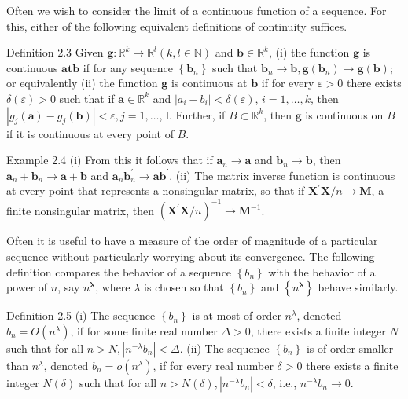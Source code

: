 \documentclass[10pt]{article}
\begin{document}
Often we wish to consider the limit of a continuous function of a sequence. For this, either of the following equivalent definitions of continuity suffices.

Definition 2.3 Given $\mathbf{g}: \mathbb{R}^{k} \rightarrow \mathbb{R}^{l}(k, l \in \mathbb{N})$ and $\mathbf{b} \in \mathbb{R}^{k}$, (i) the function $\mathbf{g}$ is continuous $\mathbf{a t} \mathbf{b}$ if for any sequence $\left\{\mathbf{b}_{n}\right\}$ such that $\mathbf{b}_{n} \rightarrow \mathbf{b}, \mathbf{g}\left(\mathbf{b}_{n}\right) \rightarrow \mathbf{g}(\mathbf{b})$; or equivalently (ii) the function $\mathbf{g}$ is continuous at $\mathbf{b}$ if for every $\varepsilon>0$ there exists $\delta(\varepsilon)>0$ such that if $\mathbf{a} \in \mathbb{R}^{k}$ and $\left|a_{i}-b_{i}\right|<\delta(\varepsilon)$, $i=1, \ldots, k$, then $\left|g_{j}(\mathbf{a})-g_{j}(\mathbf{b})\right|<\varepsilon, j=1, \ldots$, l. Further, if $B \subset \mathbb{R}^{k}$, then $\mathbf{g}$ is continuous on $B$ if it is continuous at every point of $B$.

Example 2.4 (i) From this it follows that if $\mathbf{a}_{n} \rightarrow \mathbf{a}$ and $\mathbf{b}_{n} \rightarrow \mathbf{b}$, then $\mathbf{a}_{n}+\mathbf{b}_{n} \rightarrow \mathbf{a}+\mathbf{b}$ and $\mathbf{a}_{n} \mathbf{b}_{n}^{\prime} \rightarrow \mathbf{a b}^{\prime}$. (ii) The matrix inverse function is continuous at every point that represents a nonsingular matrix, so that if $\mathbf{X}^{\prime} \mathbf{X} / n \rightarrow \mathbf{M}$, a finite nonsingular matrix, then $\left(\mathbf{X}^{\prime} \mathbf{X} / n\right)^{-1} \rightarrow \mathbf{M}^{-1}$.

Often it is useful to have a measure of the order of magnitude of a particular sequence without particularly worrying about its convergence. The following definition compares the behavior of a sequence $\left\{b_{n}\right\}$ with the behavior of a power of $n$, say $n^{\boldsymbol{\lambda}}$, where $\lambda$ is chosen so that $\left\{b_{n}\right\}$ and $\left\{n^{\boldsymbol{\lambda}}\right\}$ behave similarly.

Definition 2.5 (i) The sequence $\left\{b_{n}\right\}$ is at most of order $n^{\lambda}$, denoted $b_{n}=O\left(n^{\lambda}\right)$, if for some finite real number $\Delta>0$, there exists a finite integer $N$ such that for all $n>N,\left|n^{-\lambda} b_{n}\right|<\Delta$. (ii) The sequence $\left\{b_{n}\right\}$ is of order smaller than $n^{\lambda}$, denoted $b_{n}=o\left(n^{\lambda}\right)$, if for every real number $\delta>0$ there exists a finite integer $N(\delta)$ such that for all $n>N(\delta),\left|n^{-\lambda} b_{n}\right|<\delta$, i.e., $n^{-\lambda} b_{n} \rightarrow 0$.
\end{document}
